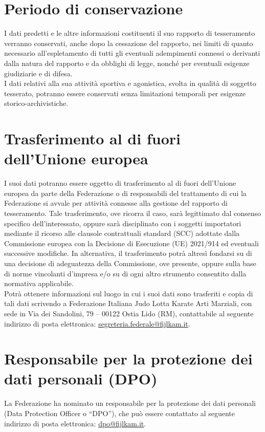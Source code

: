 \documentclass[
	twocolumn
]{djts}
\begin{document}
	\section{Periodo di conservazione}
	I dati predetti e le altre informazioni costituenti il suo rapporto di tesseramento verranno conservati, anche dopo la cessazione del rapporto, nei limiti di quanto necessario all’espletamento di tutti gli eventuali adempimenti connessi o derivanti dalla natura del rapporto e da obblighi di legge, nonché per eventuali esigenze giudiziarie e di difesa. \\
	I dati relativi alla sua attività sportiva e agonistica, svolta in qualità di soggetto tesserato, potranno essere conservati senza limitazioni temporali per esigenze storico-archivistiche.
	
	\section{Trasferimento al di fuori dell’Unione europea}
	I suoi dati potranno essere oggetto di trasferimento al di fuori dell’Unione europea da parte della Federazione o di responsabili del trattamento di cui la Federazione si avvale per attività connesse alla gestione del rapporto di tesseramento. Tale trasferimento, ove ricorra il caso, sarà legittimato dal consenso specifico dell’interessato, oppure sarà disciplinato con i soggetti importatori mediante il ricorso alle clausole contrattuali standard (SCC) adottate dalla Commissione europea con la Decisione di Esecuzione (UE) 2021/914 ed eventuali successive modifiche. In alternativa, il trasferimento potrà altresì fondarsi su di una decisione di adeguatezza della Commissione, ove presente, oppure sulla base di norme vincolanti d’impresa e/o su di ogni altro strumento consentito dalla normativa applicabile. \\
	Potrà ottenere informazioni sul luogo in cui i suoi dati sono trasferiti e copia di tali dati scrivendo a Federazione Italiana Judo Lotta Karate Arti Marziali, con sede in Via dei Sandolini, 79 – 00122 Ostia Lido (RM), contattabile al seguente indirizzo di posta elettronica: \href{mailto:segreteria.federale@fijlkam.it}{segreteria.federale@fijlkam.it}.
	
	\section*{Responsabile per la protezione dei dati personali (DPO)}
	La Federazione ha nominato un responsabile per la protezione dei dati personali (Data Protection Officer o
	“DPO”), che può essere contattato al seguente indirizzo di posta elettronica: \href{mailto:dpo@fijlkam.it}{dpo@fijlkam.it}.
	
\end{document}
